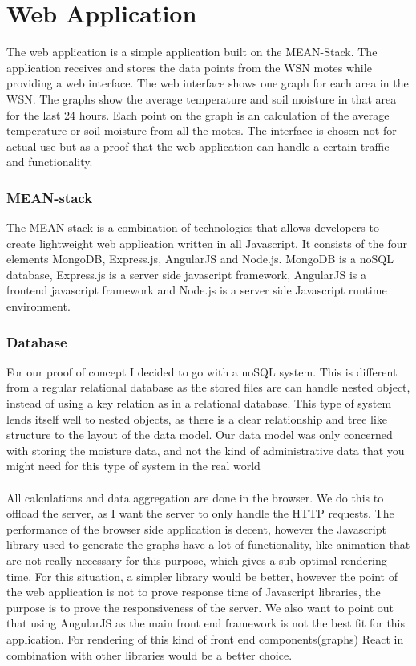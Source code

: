\documentclass[]{uiophd}
\begin{document}
\section{Web Application}
The web application is a simple application built on the MEAN-Stack. The application receives and stores the data points from the WSN motes while providing a web interface. The web interface shows one graph for each area in the WSN. The graphs show the average temperature and soil moisture in that area for the last 24 hours. Each point on the graph is an calculation of the average temperature or soil moisture from all the motes. The interface is chosen not for actual use but as a proof that the web application can handle a certain traffic and functionality. 

\subsubsection{MEAN-stack}
The MEAN-stack is a combination of technologies that allows developers to create lightweight web application written in all Javascript. It consists of the four elements MongoDB, Express.js, AngularJS and Node.js. MongoDB is a noSQL database, Express.js is a server side javascript framework, AngularJS is a frontend javascript framework and Node.js is a server side Javascript runtime environment. 

\subsubsection{Database}
For our proof of concept I decided to go with a noSQL system. This is different from a regular relational database as the stored files are can handle nested object, instead of using a key relation as in a relational database. This type of system lends itself well to nested objects, as there is a clear relationship and tree like structure to the layout of the data model. Our data model was only concerned with storing the moisture data, and not the kind of administrative data that you might need for this type of system in the real world
\\\\
All calculations and data aggregation are done in the browser. We do this to offload the server, as I want the server to only handle the HTTP requests. The performance of the browser side application is decent, however the Javascript library used to generate the graphs have a lot of functionality, like animation that are not really necessary for this purpose, which gives a sub optimal rendering time. For this situation, a simpler library would be better, however the point of the web application is not to prove response time of Javascript libraries, the purpose is to prove the responsiveness of the server. We also want to point out that using AngularJS as the main front end framework is not the best fit for this application. For rendering of this kind of front end components(graphs) React in combination with other libraries would be a better choice. 
\end{document}
